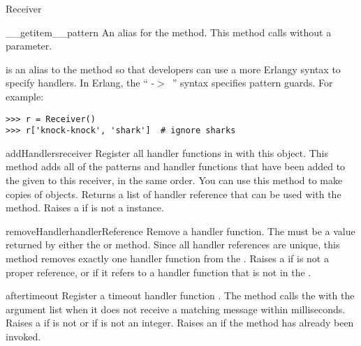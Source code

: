 \documentclass{howto}
\newcommand{\greaterthan}[0]{\begin{math}>\end{math}}
\newcommand{\greaterthan}[0]{>}
\begin{document}
\begin{classdesc}{Receiver}{}
\begin{methoddesc}{__getitem__}{pattern}
\opindex{[]}
An alias for the  method. This method calls
 without a  parameter.

 is an alias to the  method so that
developers can use a more Erlangy syntax to specify handlers. In Erlang, the
`` -\greaterthan\ '' syntax specifies pattern guards. For
example:
\begin{verbatim}
>>> r = Receiver()
>>> r['knock-knock', 'shark']  # ignore sharks
\end{verbatim}
\end{methoddesc}

\begin{methoddesc}{addHandlers}{receiver}
Register all handler functions in  with this 
object. This method adds all of the patterns and handler functions that have
been added to the given  to this receiver, in the same order. You
can use this method to make copies of  objects. Returns a list
of handler reference that can be used with the  method.
Raises a   if  is not a
 instance.
\end{methoddesc}

\begin{methoddesc}{removeHandler}{handlerReference}
Remove a handler function. The  must be a value returned
by either the  or  method. Since all
handler references are unique, this method removes exactly one handler function
from the . Raises a   if
 is not a proper reference, or if it refers to a handler
function that is not in the .
\end{methoddesc}

\begin{methoddesc}{after}{timeout}
Register a timeout handler function . The  method
calls the  with the  argument list when it does not receive
a matching message within  milliseconds. Raises a 
 if  is not  or if
 is not an integer. Raises an  if the
 method has already been invoked.


\end{methoddesc}
\end{classdesc}
\end{document}
